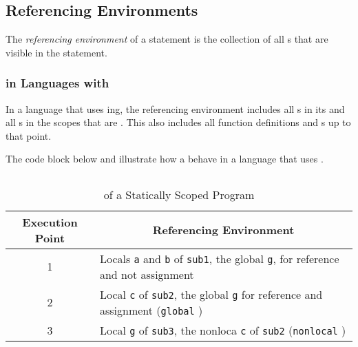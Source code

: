 \subsection{Referencing Environments}\label{subsec:Referencing_Environments}
\begin{definition}\label{def:Referencing_Environment}
  The \emph{referencing environment} of a statement is the collection of all s that are visible in the statement.
\end{definition}

\subsubsection{ in Languages with }\label{subsubsec:Static_Scope_Referencing_Environment}
In a language that uses ing, the referencing environment includes all s in its  and all s in the  scopes that are .
This also includes all function definitions and s up to that point.

The code block below and  illustrate how a  behave in a language that uses .

\inputminted[frame=lines,linenos]{python3}{./EDAP05-Concepts_Programming_Languages-Sections/Names_Identifiers/Code/Static_Scope_Referencing_Environment.py}

\begin{table}[h!]
  \centering
  \begin{tabular}{cl}
    \toprule
    Execution Point & \multicolumn{1}{c}{Referencing Environment} \\
    \midrule
    1 & Locals \texttt{a} and \texttt{b} of \texttt{sub1}, the global \texttt{g}, for reference and not assignment \\
    2 & Local \texttt{c} of \texttt{sub2}, the global \texttt{g} for reference and assignment (\texttt{global} \nameref{def:Reserved_Word}) \\
    3 & Local \texttt{g} of \texttt{sub3}, the nonloca \texttt{c} of \texttt{sub2} (\texttt{nonlocal} \nameref{def:Reserved_Word}) \\
    \bottomrule
  \end{tabular}
  \caption{ of a Statically Scoped Program}
  \label{tab:Static_Scope_Referencing_Environment-Execution}
\end{table}

